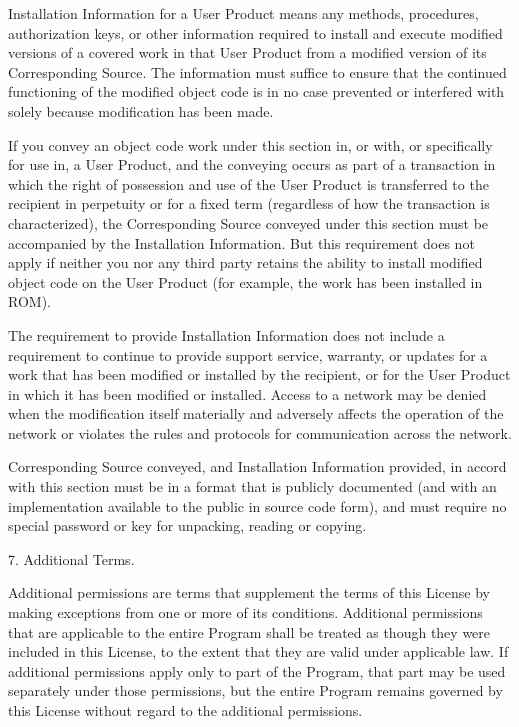\documentclass[letterpaper,10pt,english]{sphinxmanual}
\begin{document}
\begin{sphinxVerbatim}[commandchars=\\\{\}]
  \PYGZdq{}Installation Information\PYGZdq{} for a User Product means any methods,
procedures, authorization keys, or other information required to install
and execute modified versions of a covered work in that User Product from
a modified version of its Corresponding Source.  The information must
suffice to ensure that the continued functioning of the modified object
code is in no case prevented or interfered with solely because
modification has been made.

  If you convey an object code work under this section in, or with, or
specifically for use in, a User Product, and the conveying occurs as
part of a transaction in which the right of possession and use of the
User Product is transferred to the recipient in perpetuity or for a
fixed term (regardless of how the transaction is characterized), the
Corresponding Source conveyed under this section must be accompanied
by the Installation Information.  But this requirement does not apply
if neither you nor any third party retains the ability to install
modified object code on the User Product (for example, the work has
been installed in ROM).

  The requirement to provide Installation Information does not include a
requirement to continue to provide support service, warranty, or updates
for a work that has been modified or installed by the recipient, or for
the User Product in which it has been modified or installed.  Access to a
network may be denied when the modification itself materially and
adversely affects the operation of the network or violates the rules and
protocols for communication across the network.

  Corresponding Source conveyed, and Installation Information provided,
in accord with this section must be in a format that is publicly
documented (and with an implementation available to the public in
source code form), and must require no special password or key for
unpacking, reading or copying.

  7. Additional Terms.

  \PYGZdq{}Additional permissions\PYGZdq{} are terms that supplement the terms of this
License by making exceptions from one or more of its conditions.
Additional permissions that are applicable to the entire Program shall
be treated as though they were included in this License, to the extent
that they are valid under applicable law.  If additional permissions
apply only to part of the Program, that part may be used separately
under those permissions, but the entire Program remains governed by
this License without regard to the additional permissions.


\end{sphinxVerbatim}
\end{document}
